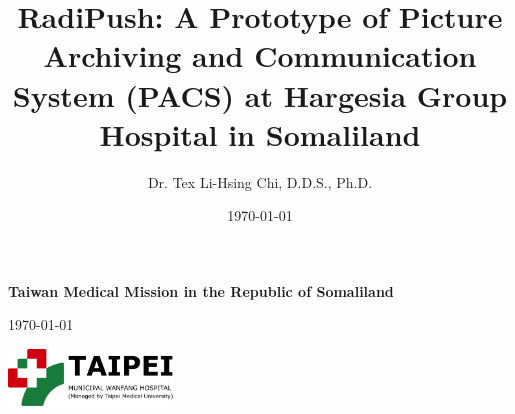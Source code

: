 \documentclass{article}
\title{RadiPush: A Prototype of Picture Archiving and Communication System (PACS) at Hargesia Group Hospital in Somaliland}
\author{Dr. Tex Li-Hsing Chi, D.D.S., Ph.D.}
\date{\today}
\begin{document}
\begin{titlepage}

\hspace*{-0.7cm}%
\begin{tikzpicture} %


\hspace{1.4cm}
%

\end{tikzpicture}
    \vspace{2cm}
    
\centering
    {\Huge\bfseries Taiwan Medical Mission in the Republic of Somaliland \\
    \par } %
    \vspace{1.5cm}
    {\Large \today \par}


\vspace{2.0cm}
%
\includegraphics[height=1.5cm]{TMWH_logo_TAIPEI_vector.pdf}
\\
\vspace{1cm}



\end{titlepage}



\maketitle
\end{document}
